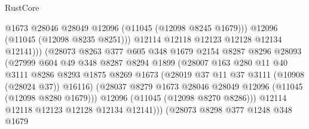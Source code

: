 \begin{lexlean}{RustCore}
\begin{coremodule}
                                      @1673
                                      @28046
                                      @28049
                                      @12096
                                      (@11045 (@12098 @8245 @1679)))
                                    @12096
                                    (@11045 (@12098 @8235 @8251)))
                                  @12114
                                  @12118
                                  @12123
                                  @12128
                                  @12134
                                  @12141)))
                            (@28073
                              @8263
                              @377
                              @605
                              @348
                              @1679
                              @2154
                              @8287
                              @8296
                              @28093
                              (@27999
                                @604
                                @49
                                @348
                                @8287
                                @8294
                                @1899
                                (@28007
                                  @163
                                  @280
                                  @11
                                  @40
                                  @3111
                                  @8286
                                  @8293
                                  @1875
                                  @8269
                                  @1673
                                  (@28019 @37 @11 @37 @3111 (@10908 (@28024 @37)) @16116)
                                  (@28037
                                    @8279
                                    @1673
                                    @28046
                                    @28049
                                    @12096
                                    (@11045 (@12098 @8280 @1679)))
                                  @12096
                                  (@11045 (@12098 @8270 @8286)))
                                @12114
                                @12118
                                @12123
                                @12128
                                @12134
                                @12141)))
                          (@28073
                            @8298
                            @377
                            @1248
                            @348
                            @1679

\end{coremodule}
\end{lexlean}

